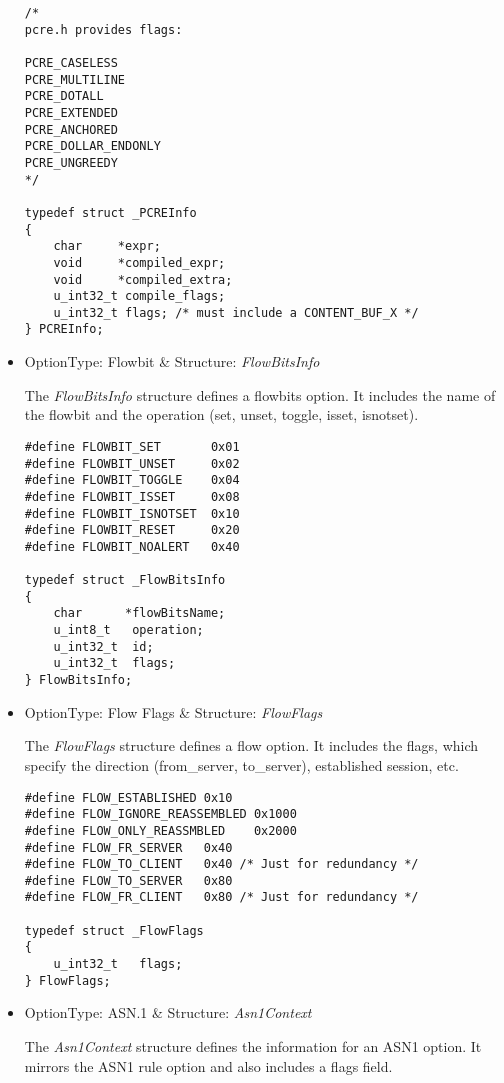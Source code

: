 \documentclass[english]{report}
\begin{document}
\begin{itemize}
\begin{verbatim}
/*
pcre.h provides flags:

PCRE_CASELESS
PCRE_MULTILINE
PCRE_DOTALL
PCRE_EXTENDED
PCRE_ANCHORED
PCRE_DOLLAR_ENDONLY
PCRE_UNGREEDY
*/

typedef struct _PCREInfo
{
    char     *expr;
    void     *compiled_expr;
    void     *compiled_extra;
    u_int32_t compile_flags;
    u_int32_t flags; /* must include a CONTENT_BUF_X */
} PCREInfo;
\end{verbatim}

\item {OptionType: Flowbit \& Structure: {\em FlowBitsInfo}}

The {\em FlowBitsInfo} structure defines a flowbits option.  It includes the
name of the flowbit and the operation (set, unset, toggle, isset, isnotset).

\begin{verbatim}
#define FLOWBIT_SET       0x01
#define FLOWBIT_UNSET     0x02
#define FLOWBIT_TOGGLE    0x04
#define FLOWBIT_ISSET     0x08
#define FLOWBIT_ISNOTSET  0x10
#define FLOWBIT_RESET     0x20
#define FLOWBIT_NOALERT   0x40

typedef struct _FlowBitsInfo
{
    char      *flowBitsName;
    u_int8_t   operation;
    u_int32_t  id;
    u_int32_t  flags;
} FlowBitsInfo;
\end{verbatim}

\item {OptionType: Flow Flags \& Structure: {\em FlowFlags}}

The {\em FlowFlags} structure defines a flow option.  It includes the flags,
which specify the direction (from\_server, to\_server), established session,
etc. 

\begin{verbatim}
#define FLOW_ESTABLISHED 0x10
#define FLOW_IGNORE_REASSEMBLED 0x1000
#define FLOW_ONLY_REASSMBLED    0x2000
#define FLOW_FR_SERVER   0x40
#define FLOW_TO_CLIENT   0x40 /* Just for redundancy */
#define FLOW_TO_SERVER   0x80
#define FLOW_FR_CLIENT   0x80 /* Just for redundancy */

typedef struct _FlowFlags
{
    u_int32_t   flags;
} FlowFlags;
\end{verbatim}

\item {OptionType: ASN.1 \& Structure: {\em Asn1Context}}

The {\em Asn1Context} structure defines the information for an ASN1 option.  It
mirrors the ASN1 rule option and also includes a flags field.


\end{itemize}
\end{document}
